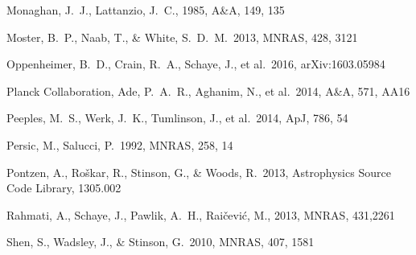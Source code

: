 \documentclass[useAMS,usenatbib]{mn2e}
\def \apj {ApJ}
\def \mnras {MNRAS}
\def \aap {A\&A}
\begin{document}
\begin{thebibliography}{}
 Monaghan, J.~J., Lattanzio, J.~C., 1985, \aap, 149, 135

 Moster, B.~P., Naab, T., 
\& White, S.~D.~M.\ 2013, \mnras, 428, 3121 










%
Oppenheimer, B.~D., Crain, R.~A., Schaye, J., et al.\ 2016, arXiv:1603.05984


  Planck Collaboration, Ade, P.~A.~R., Aghanim, N., et al.\ 2014,
  \aap, 571, AA16 
 
 Peeples, M.~S., Werk, J.~K., Tumlinson, J., et al.\ 2014, \apj, 786, 54


 Persic, M., Salucci, P.\ 1992, \mnras, 258, 14

 Pontzen, A., Ro{\v s}kar, R., Stinson, G., \& Woods, R.\ 2013, Astrophysics Source Code Library, 1305.002 



 Rahmati, A., Schaye, J., Pawlik, A.~H., Rai{\v c}evi{\'c}, M., 2013, MNRAS, 431,2261


 Shen, S., Wadsley, J., 
\& Stinson, G.\ 2010, \mnras, 407, 1581 


\end{thebibliography}
\end{document}
